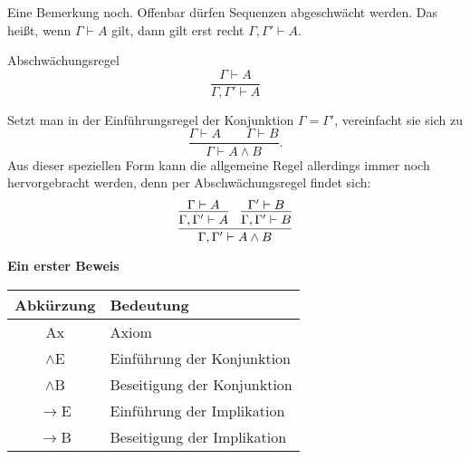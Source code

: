 \documentclass[8pt]{beamer}
\newcommand{\strong}[1]{\textsf{\textbf{#1}}}
\newcommand{\centerheadline}[1]{%
  \begin{center}\strong{#1}\end{center}}
\newcommand{\cond}{\rightarrow}
\begin{document}
\begin{frame}
Eine Bemerkung noch. Offenbar dürfen Sequenzen abgeschwächt werden.
Das heißt, wenn
$\Gamma\vdash A$ gilt, dann gilt erst recht $\Gamma,\Gamma'\vdash A$.\pause
\begin{block}{Abschwächungsregel}
\[\dfrac{\Gamma\vdash A}{\Gamma,\Gamma'\vdash A}\]
\end{block}\pause
Setzt man in der Einführungsregel der Konjunktion $\Gamma=\Gamma'$, vereinfacht sie sich zu
\[\dfrac{\Gamma\vdash A\qquad\Gamma\vdash B}{\Gamma\vdash A\land B}.\]
Aus dieser speziellen Form kann die allgemeine Regel allerdings immer noch
hervorgebracht werden, denn per Abschwächungsregel findet sich:
\[
\infer{\Gamma,\Gamma'\vdash A\land B}{
  \infer{\Gamma,\Gamma'\vdash A}{\Gamma\vdash A}
& \infer{\Gamma,\Gamma'\vdash B}{\Gamma'\vdash B}}
\]
\end{frame}

\begin{frame}
\centerheadline{Ein erster Beweis}
\end{frame}

\begin{frame}
\begin{center}
\begin{tabular}{cl}
\toprule
\strong{Abkürzung} & \strong{Bedeutung}\\
\midrule
Ax & Axiom\\
$\land$E & Einführung der Konjunktion\\
$\land$B & Beseitigung der Konjunktion\\
$\cond$E & Einführung der Implikation\\
$\cond$B & Beseitigung der Implikation\\
\bottomrule
\end{tabular}
\end{center}
\end{frame}
\end{document}
